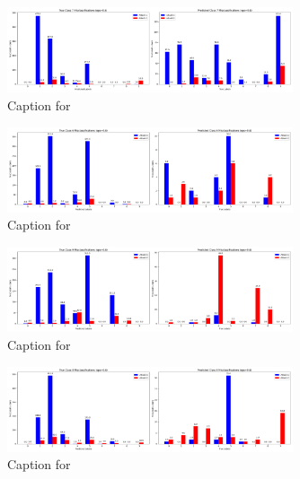 \documentclass{article}
\begin{document}
\begin{figure}[!htbp]
\centering
\includegraphics[width=0.75\textwidth]{combined_class_boundary_pgd/combined_class_7_misclassifications_eps_0.6.png}
\caption{Caption for }
\label{fig:combined_class_7_misclassifications_eps_0.6.png}
\end{figure}

\begin{figure}[!htbp]
\centering
\includegraphics[width=0.75\textwidth]{combined_class_boundary_pgd/combined_class_6_misclassifications_eps_0.6.png}
\caption{Caption for }
\label{fig:combined_class_6_misclassifications_eps_0.6.png}
\end{figure}

\begin{figure}[!htbp]
\centering
\includegraphics[width=0.75\textwidth]{combined_class_boundary_pgd/combined_class_9_misclassifications_eps_0.6.png}
\caption{Caption for }
\label{fig:combined_class_9_misclassifications_eps_0.6.png}
\end{figure}

\begin{figure}[!htbp]
\centering
\includegraphics[width=0.75\textwidth]{combined_class_boundary_pgd/combined_class_8_misclassifications_eps_0.6.png}
\caption{Caption for }
\label{fig:combined_class_8_misclassifications_eps_0.6.png}
\end{figure}
\end{document}
